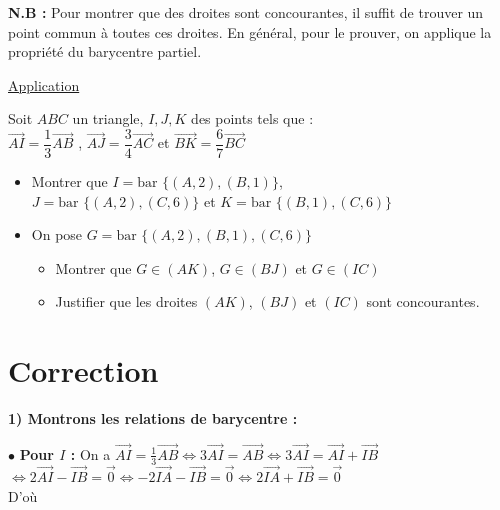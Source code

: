 \documentclass{article}
\begin{document}
\noindent \textbf{N.B :} Pour montrer que des droites sont concourantes, il suffit de trouver un point commun à toutes ces droites. En général, pour le prouver, on applique la propriété du barycentre partiel.

\vspace{2em}

\begin{center}
    \color{red} \Large \underline{Application}
\end{center}

\noindent Soit $ABC$ un triangle, $I, J, K$ des points tels que : \\
$\overrightarrow{AI} = \dfrac{1}{3} \overrightarrow{AB}$ , $\overrightarrow{AJ} = \dfrac{3}{4} \overrightarrow{AC}$ et $\overrightarrow{BK} = \dfrac{6}{7} \overrightarrow{BC}$

\vspace{1em}

\begin{itemize}
    \item[1)] Montrer que $I = \text{bar } \{(A, 2), (B, 1)\}$, \\
    $J = \text{bar } \{(A, 2), (C, 6)\}$ et $K = \text{bar } \{(B, 1), (C, 6)\}$
    \item[2)] On pose $G = \text{bar } \{(A, 2), (B, 1), (C, 6)\}$
    \begin{itemize}
        \item[a)] Montrer que $G \in (AK)$, $G \in (BJ)$ et $G \in (IC)$
        \item[b)] Justifier que les droites $(AK)$, $(BJ)$ et $(IC)$ sont concourantes.
    \end{itemize}
\end{itemize}

\section*{Correction}

\noindent \textbf{1) Montrons les relations de barycentre :}

\vspace{0.5em}
\noindent $\bullet$ \textbf{Pour $I$ :} On a $\overrightarrow{AI} = \frac{1}{3} \overrightarrow{AB} \iff 3\overrightarrow{AI} = \overrightarrow{AB} \iff 3\overrightarrow{AI} = \overrightarrow{AI} + \overrightarrow{IB}$ \\
$\iff 2\overrightarrow{AI} - \overrightarrow{IB} = \vec{0} \iff -2\overrightarrow{IA} - \overrightarrow{IB} = \vec{0} \iff 2\overrightarrow{IA} + \overrightarrow{IB} = \vec{0}$ \\
D'où 
\end{document}
